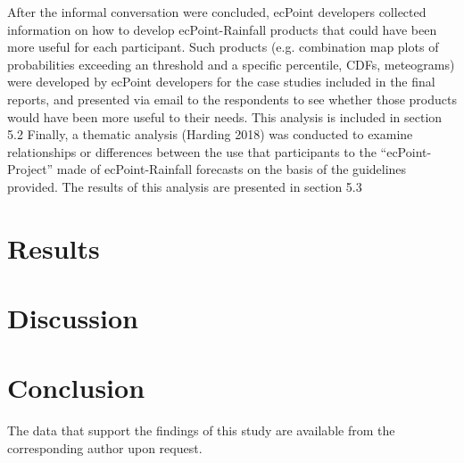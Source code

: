\documentclass[twocol]{ametsocV5} %
\begin{document}
After the informal conversation were concluded, ecPoint developers collected information on how to develop ecPoint-Rainfall products that could have been more useful for each participant. Such products (e.g. combination map plots of probabilities exceeding an threshold and a specific percentile, CDFs, meteograms) were developed by ecPoint developers for the case studies included in the final reports, and presented via email to the respondents to see whether those products would have been more useful to their needs. This analysis is included in section 5.2
Finally, a thematic analysis (Harding 2018) was conducted to examine relationships or differences between the use that participants to the “ecPoint-Project” made of ecPoint-Rainfall forecasts on the basis of the guidelines provided. The results of this analysis are presented in section 5.3



\section{Results}


\section{Discussion}


\section{Conclusion}


\acknowledgments


\datastatement
The data that support the findings of this study are available from the corresponding author upon request.




\end{document}
